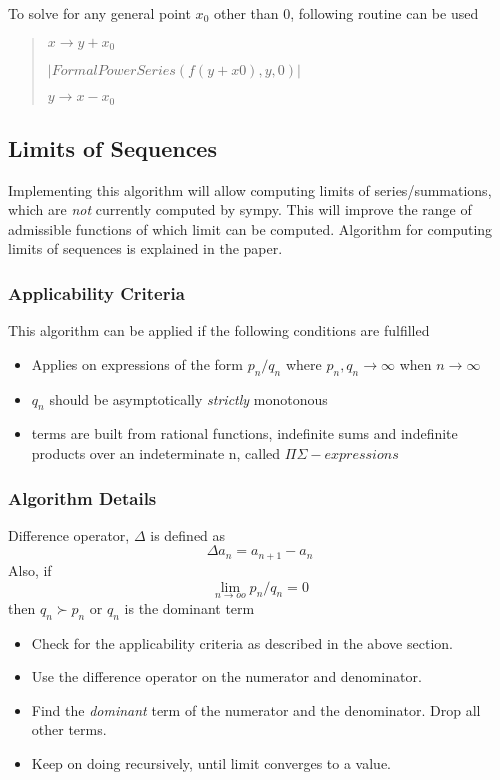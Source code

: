 \documentclass[a4paper,12pt]{article}
\newcommand{\pyline}[1]{\texttt|#1|}
\begin{document}
To solve for any general point $x_0$ other than 0, following routine can be used

\begin{quote}
  $ x \to y + x_0 $

  $ \pyline{FormalPowerSeries(f(y+x0), y, 0)} $

  $ y \to x - x_0 $
\end{quote}

\subsection{Limits of Sequences}

Implementing this algorithm will allow computing limits of series/summations, which are \textit{not} currently computed by sympy. This will improve the range of admissible functions of which limit can be computed. Algorithm for computing limits of sequences is explained in the paper\cite{limits}.

\subsubsection{Applicability Criteria}
This algorithm can be applied if the following conditions are fulfilled
\begin{itemize}
  \item Applies on expressions of the form $p_{n}/q_{n}$ where $p_{n}, q_{n} \to \infty$ when $n \to \infty$
  \item $q_{n}$ should be asymptotically \textit{strictly} monotonous
  \item terms are built from rational functions, indefinite sums and indefinite products over an indeterminate n, called $\Pi\Sigma-expressions$
\end{itemize}

\subsubsection{Algorithm Details}
Difference operator, $\Delta$ is defined as
  $$\Delta a_{n} = a_{n+1} - a_{n}$$
Also, if
$$\lim_{n \to oo}p_{n}/q_{n} = 0$$
then $q_{n} \succ p_{n}$ or $q_{n}$ is the dominant term

\begin{itemize}
  \item Check for the applicability criteria as described in the above section.
  \item Use the difference operator on the numerator and denominator.
  \item Find the \textit{dominant} term of the numerator and the denominator. Drop all other terms.
  \item Keep on doing recursively, until limit converges to a value.
\end{itemize}
\end{document}

